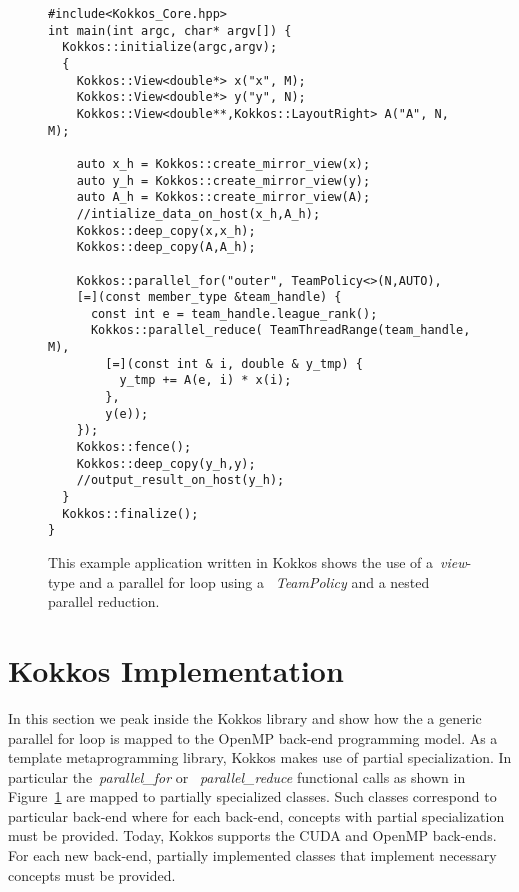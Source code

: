 \begin{figure}
\begin{small}
\begin{Verbatim}[frame=leftline]
#include<Kokkos_Core.hpp>
int main(int argc, char* argv[]) {
  Kokkos::initialize(argc,argv);
  {
    Kokkos::View<double*> x("x", M);  
    Kokkos::View<double*> y("y", N);
    Kokkos::View<double**,Kokkos::LayoutRight> A("A", N, M);  

    auto x_h = Kokkos::create_mirror_view(x);
    auto y_h = Kokkos::create_mirror_view(y);
    auto A_h = Kokkos::create_mirror_view(A);
    //intialize_data_on_host(x_h,A_h);
    Kokkos::deep_copy(x,x_h);
    Kokkos::deep_copy(A,A_h);    

    Kokkos::parallel_for("outer", TeamPolicy<>(N,AUTO),
    [=](const member_type &team_handle) {
      const int e = team_handle.league_rank();
      Kokkos::parallel_reduce( TeamThreadRange(team_handle, M),
        [=](const int & i, double & y_tmp) {
          y_tmp += A(e, i) * x(i);
        }, 
        y(e));
    }); 
    Kokkos::fence();
    Kokkos::deep_copy(y_h,y);
    //output_result_on_host(y_h);
  }
  Kokkos::finalize();
}
\end{Verbatim}
\end{small}
\caption{This example application written in Kokkos shows the use of a~\emph{view}-type and a parallel for loop using a ~\emph{TeamPolicy} and a nested parallel reduction. }
\label{fig:KokkosExample}
\end{figure}


\section{Kokkos Implementation}

In this section we peak inside the Kokkos library and show how the a generic parallel for loop is mapped to the OpenMP back-end programming model. As a template metaprogramming library, Kokkos makes use of partial specialization. In particular the~\emph{parallel_for} or ~\emph{parallel_reduce} functional calls as shown in Figure~\ref{fig:KokkosExample} are mapped to partially specialized classes. Such classes correspond to particular back-end where for each back-end, concepts with partial specialization must be provided. Today, Kokkos supports the CUDA and OpenMP back-ends. For each new back-end, partially implemented classes that implement necessary concepts must be provided.

